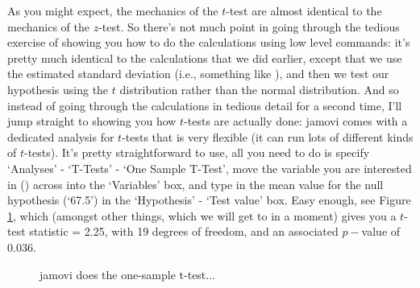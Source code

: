 
As you might expect, the mechanics of the $t$-test are almost identical to the mechanics of the $z$-test. So there's not much point in going through the tedious exercise of showing you how to do the calculations using low level commands: it's pretty much identical to the calculations that we did earlier, except that we use the estimated standard deviation (i.e., something like ), and then we test our hypothesis using the $t$ distribution rather than the normal distribution. And so instead of going through the calculations in tedious detail for a second time, I'll jump straight to showing you how $t$-tests are actually done: jamovi comes with a dedicated analysis for $t$-tests that is very flexible (it can run lots of different kinds of $t$-tests). It's pretty straightforward to use, all you need to do is specify `Analyses' - `T-Tests' - `One Sample T-Test', move the variable you are interested in () across into the `Variables' box, and type in the mean value for the null hypothesis (`67.5') in the `Hypothesis' - `Test value' box. Easy enough, see Figure \ref{fig:ttest_one}, which (amongst other things, which we will get to in a moment) gives you a $t$-test statistic = 2.25, with 19 degrees of freedom, and an associated $p-$value of 0.036.

\begin{figure}[h!!]
\begin{center}
\caption{jamovi does the one-sample t-test...}
\HR
\label{fig:ttest_one}
\end{center}
\end{figure}


